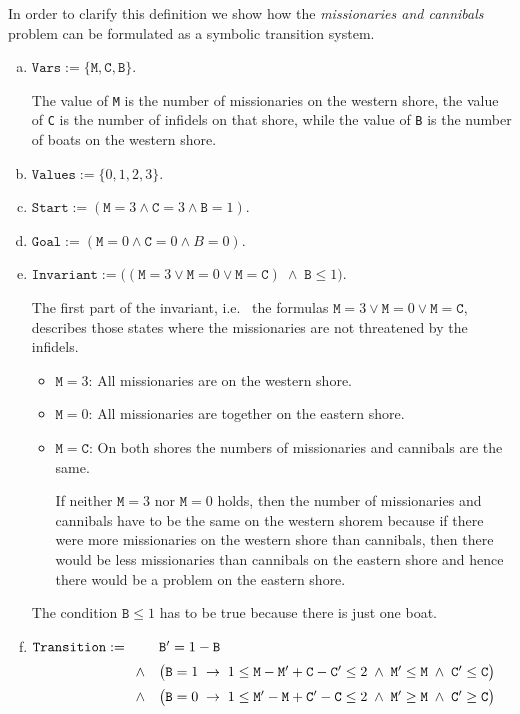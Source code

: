 In order to clarify this definition we show how the \emph{missionaries and cannibals} problem can be formulated as
a symbolic transition system.
\begin{enumerate}[(a)]
\item $\texttt{Vars} := \{ \mathtt{M}, \mathtt{C}, \mathtt{B} \}$.

      The value of \texttt{M} is the number of missionaries on the western shore, the value of \texttt{C} is
      the number of infidels on that shore, while the value of \texttt{B} is the number of boats on the western
      shore.
\item $\mathtt{Values} := \{ 0, 1, 2, 3 \}$.
\item $\texttt{Start} := (\mathtt{M} = 3 \wedge \mathtt{C} = 3 \wedge \mathtt{B} = 1)$.
\item $\texttt{Goal}  := (\mathtt{M} = 0 \wedge \mathtt{C} = 0 \wedge B = 0)$.
\item $\texttt{Invariant} := \bigl((\mathtt{M} = 3 \vee \mathtt{M} = 0 \vee \mathtt{M} = \mathtt{C}) \;\wedge\; \mathtt{B} \leq 1\bigr)$.

      The first part of the invariant, i.e.~ the formulas $\mathtt{M} = 3 \vee \mathtt{M} = 0 \vee \mathtt{M} = \mathtt{C}$,
      describes those states where the missionaries are not threatened by the infidels.
      \begin{itemize}
      \item $\mathtt{M} = 3$: All missionaries are on the western shore.
      \item $\mathtt{M} = 0$: All missionaries are together on the eastern shore.
      \item $\mathtt{M} = \mathtt{C}$: On both shores the numbers of missionaries and cannibals are the same.

            If neither $\mathtt{M} = 3$ nor $\mathtt{M} = 0$ holds, then the number of missionaries and
            cannibals have to be the same on the western shorem because if there were more missionaries on the
            western shore than cannibals, then there would be less missionaries than cannibals on the eastern
            shore and hence there would be a problem on the eastern shore.
      \end{itemize}
      The condition $\mathtt{B} \leq 1$ has to be true because there is just one boat.
\item $\texttt{Transition} :=
      \begin{array}[t]{cl}
         &  \mathtt{B}' = 1 - \mathtt{B}   \\[0.2cm]
        \wedge & \bigl(\mathtt{B} = 1 \;\rightarrow\; 1 \leq \mathtt{M} - \mathtt{M}'  + \mathtt{C} - \mathtt{C}' \leq 2 \;\wedge\;
        \mathtt{M}' \leq \mathtt{M} \;\wedge\; \mathtt{C}' \leq \mathtt{C}\bigr) \\[0.2cm]
        \wedge & \bigl(\mathtt{B} = 0 \;\rightarrow\; 1 \leq \mathtt{M}' - \mathtt{M}  + \mathtt{C}' - \mathtt{C} \leq 2 \;\wedge\;
                \mathtt{M}' \geq \mathtt{M} \;\wedge\; \mathtt{C}' \geq \mathtt{C}\bigr) 
      \end{array}
      $


\end{enumerate}
